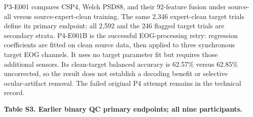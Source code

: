 \documentclass[11pt]{article}
\begin{document}
P3-E001 compares CSP4, Welch PSD88, and their 92-feature fusion under source-all versus source-expert-clean training. The same 2,346 expert-clean target trials define its primary endpoint; all 2,592 and the 246 flagged target trials are secondary strata. P4-E001B is the successful EOG-processing retry: regression coefficients are fitted on clean source data, then applied to three synchronous target EOG channels. It uses no target parameter fit but requires those additional sensors. Its clean-target balanced accuracy is 62.57\% versus 62.85\% uncorrected, so the result does not establish a decoding benefit or selective ocular-artifact removal. The failed original P4 attempt remains in the technical record.

\par\medskip\noindent\textbf{Table S3. Earlier binary QC primary endpoints; all nine participants.}
\begingroup\small\setlength{\tabcolsep}{4pt}
\end{document}
